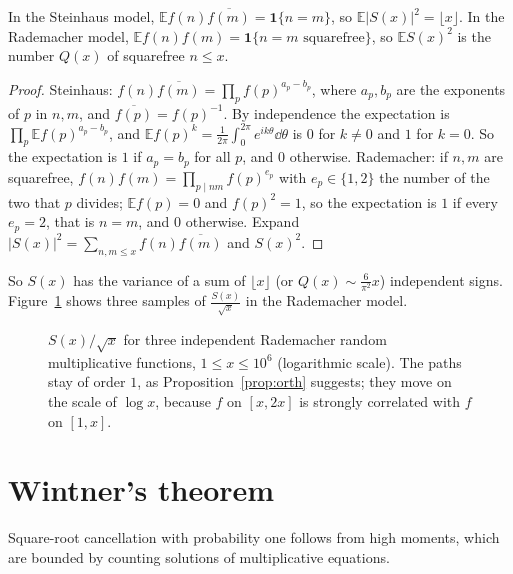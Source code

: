 \begin{proposition}\label{prop:orth}
In the Steinhaus model, $\mathbb E f(n)\overline{f(m)}=\mathbf 1\{n=m\}$, so $\mathbb E|S(x)|^2=\lfloor x\rfloor$. In the Rademacher model, $\mathbb Ef(n)f(m)=\mathbf 1\{n=m\text{ squarefree}\}$, so $\mathbb ES(x)^2$ is the number $Q(x)$ of squarefree $n\le x$.
\end{proposition}
\begin{proof}
Steinhaus: $f(n)\overline{f(m)}=\prod_pf(p)^{a_p-b_p}$, where $a_p,b_p$ are the exponents of $p$ in $n,m$, and $\overline{f(p)}=f(p)^{-1}$. By independence the expectation is $\prod_p\mathbb Ef(p)^{a_p-b_p}$, and $\mathbb Ef(p)^k=\frac1{2\pi}\int_0^{2\pi}e^{ik\theta}\dd\theta$ is $0$ for $k\ne0$ and $1$ for $k=0$. So the expectation is $1$ if $a_p=b_p$ for all $p$, and $0$ otherwise. Rademacher: if $n,m$ are squarefree, $f(n)f(m)=\prod_{p\mid nm}f(p)^{e_p}$ with $e_p\in\{1,2\}$ the number of the two that $p$ divides; $\mathbb Ef(p)=0$ and $f(p)^2=1$, so the expectation is $1$ if every $e_p=2$, that is $n=m$, and $0$ otherwise. Expand $|S(x)|^2=\sum_{n,m\le x}f(n)\overline{f(m)}$ and $S(x)^2$.
\end{proof}

So $S(x)$ has the variance of a sum of $\lfloor x\rfloor$ (or $Q(x)\sim\frac6{\pi^2}x$) independent signs. Figure~\ref{fig:rmfpaths} shows three samples of $\frac{S(x)}{\sqrt x}$ in the Rademacher model.

\begin{figure}[ht]
\centering{}
\caption{$S(x)/\sqrt x$ for three independent Rademacher random multiplicative functions, $1\le x\le10^6$ (logarithmic scale). The paths stay of order $1$, as Proposition~\ref{prop:orth} suggests; they move on the scale of $\log x$, because $f$ on $[x,2x]$ is strongly correlated with $f$ on $[1,x]$.}
\label{fig:rmfpaths}
\end{figure}

\section{Wintner's theorem}\label{sec:wintner}

Square-root cancellation with probability one follows from high moments, which are bounded by counting solutions of multiplicative equations.

